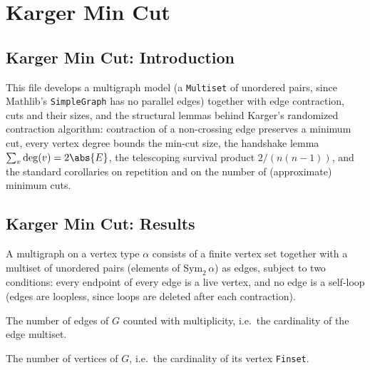 \section{Karger Min Cut}
\subsection*{Karger Min Cut: Introduction}

This file develops a multigraph model (a \texttt{Multiset} of unordered pairs, since
Mathlib's \texttt{SimpleGraph} has no parallel edges) together with edge contraction,
cuts and their sizes, and the structural lemmas behind Karger's randomized contraction
algorithm: contraction of a non-crossing edge preserves a minimum cut, every vertex
degree bounds the min-cut size, the handshake lemma $\sum_v \deg(v) = 2\abs{E}$, the
telescoping survival product $2/(n(n-1))$, and the standard corollaries on repetition
and on the number of (approximate) minimum cuts.

\subsection*{Karger Min Cut: Results}

\begin{definition}[Multigraph]
\label{Multigraph}
\leanok
A multigraph on a vertex type $\alpha$ consists of a finite vertex set together with a
multiset of unordered pairs (elements of $\mathrm{Sym}_2\,\alpha$) as edges, subject to
two conditions: every endpoint of every edge is a live vertex, and no edge is a
self-loop (edges are loopless, since loops are deleted after each contraction).
\end{definition}

\begin{definition}
\label{Multigraph.edgeCount}
\leanok
{}
The number of edges of $G$ counted with multiplicity, i.e.\ the cardinality of the
edge multiset.
\end{definition}

\begin{definition}
\label{Multigraph.vertexCount}
\leanok
{}
The number of vertices of $G$, i.e.\ the cardinality of its vertex \texttt{Finset}.
\end{definition}

